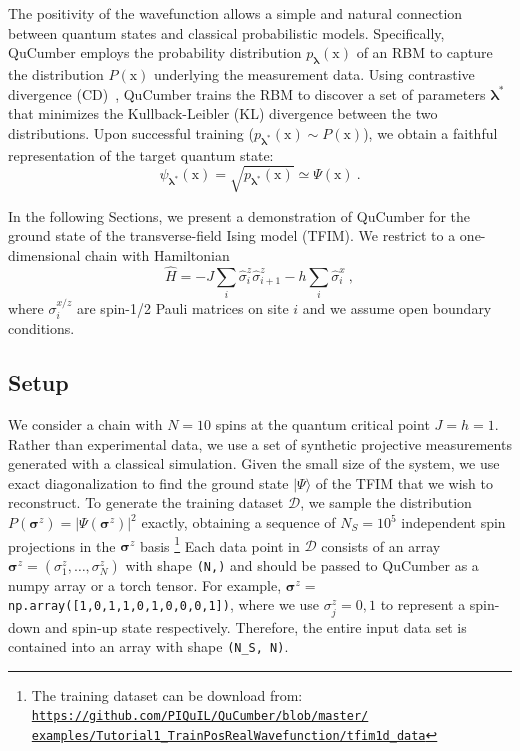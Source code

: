 \documentclass[submission, Phys, hidelnks]{SciPost}
\begin{document}
The positivity of the wavefunction allows a simple and natural connection between quantum states and classical probabilistic models. Specifically, QuCumber employs the probability distribution $p_{\bm{\lambda}}(\bm{\mathrm{x}})$ of an RBM to capture the distribution $P(\bm{\mathrm{x}})$ underlying the measurement data. Using contrastive divergence (CD)~\cite{hinton2002training}, QuCumber trains the RBM to discover a set of parameters $\bm{\lambda}^*$ that minimizes the Kullback-Leibler (KL) divergence between the two distributions. Upon successful training ($p_{\bm{\lambda}^*}(\bm{\mathrm{x}})\sim P(\bm{\mathrm{x}})$), we obtain a faithful representation of the target quantum state:
\begin{equation}\label{wfpd}
    \psi_{\bm{\lambda}^*}(\bm{\mathrm{x}})= \sqrt{p_{\bm{\lambda}^*}(\bm{\mathrm{x}})}
    \simeq\Psi(\bm{\mathrm{x}})\:.
\end{equation} 

In the following Sections, we present a demonstration of QuCumber for the ground state of the transverse-field Ising model (TFIM). We restrict to a one-dimensional chain with Hamiltonian
\begin{equation}
    \hat{H} = -J\sum_i \hat{\sigma}^z_i \hat{\sigma}^z_{i+1} - h \sum_i\hat{\sigma}^x_i\:, \label{TFIM}
\end{equation}
where $\sigma^{x/z}_i$ are spin-1/2 Pauli matrices on site $i$ and we assume open boundary conditions.

\subsection{Setup}\label{subsec:example}
We consider a chain with $N=10$ spins at the quantum critical point $J=h=1$. Rather than experimental data, we use a set of synthetic projective measurements generated with a classical simulation. Given the small size of the system, we use exact diagonalization to find the ground state $|\Psi\rangle$ of the TFIM that we wish to reconstruct. To generate the training dataset $\mathcal{D}$, we sample the distribution $P(\bm{\sigma}^z)=|\Psi(\bm{\sigma}^z)|^2$ exactly, obtaining a sequence of $N_S=10^5$ independent spin projections in the $\bm{\sigma}^z$ basis
\footnote{The training dataset can be download from: 
    \href{https://github.com/PIQuIL/QuCumber/blob/master/examples/Tutorial1_TrainPosRealWavefunction/tfim1d_data.txt}{\texttt{https://github.com/PIQuIL/QuCumber/blob/master/\\examples/Tutorial1\_TrainPosRealWavefunction/tfim1d\_data}}
}
Each data point in $\mathcal{D}$ consists of an array $\bm{\sigma}^z=(\sigma^z_1,\dots,\sigma^z_N)$ with shape \verb|(N,)| and should be passed to QuCumber as a numpy array or a torch tensor. For example, $\bm{\sigma}^z=$ \verb|np.array([1,0,1,1,0,1,0,0,0,1])|, where we use $\sigma_j^z=0,1$ to represent a spin-down and spin-up state respectively. Therefore, the entire input data set is contained into an array with shape \verb|(N_S, N)|.
\end{document}
